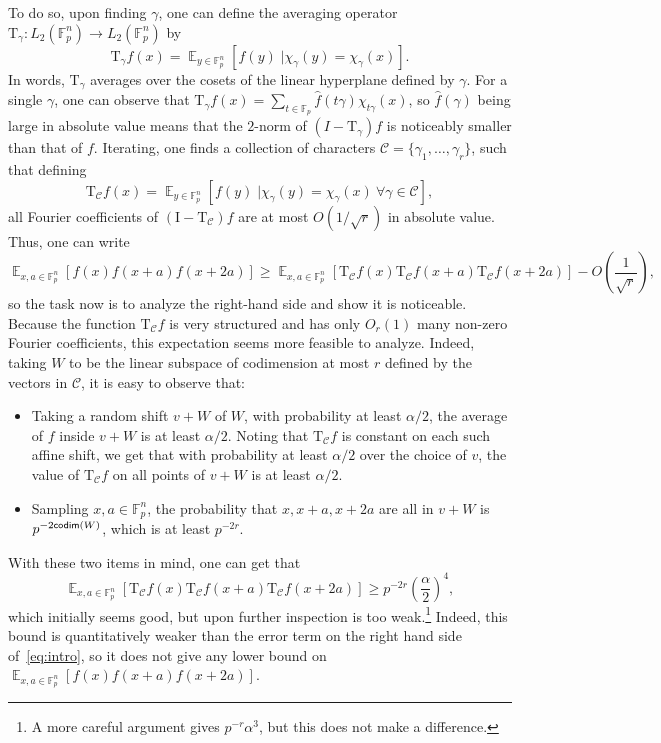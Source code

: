 \documentclass[10pt,a4paper]{amsart}
\newcommand\cExpect[3]{{\mathop{\mathbb{E}}_{#1}\left[ \left. #3 \;\right\vert #2 \right]}}
\newcommand\Expect[2]{{\mathop{\mathbb{E}}_{#1}\left[ {#2} \right]}}
\renewcommand\geq{\geqslant}
\begin{document}
To do so, upon finding $\gamma$, one can define the averaging operator 
$\mathrm{T}_{\gamma}\colon L_2(\mathbb{F}_p^n)\to L_2(\mathbb{F}_p^n)$ by
\[
\mathrm{T}_{\gamma}f(x)
=\cExpect{y\in\mathbb{F}_p^n}
{\chi_{\gamma}(y) = \chi_{\gamma}(x)}{f(y)}.
\]
In words, $\mathrm{T}_{\gamma}$ averages over the cosets of the linear hyperplane defined by $\gamma$. For a single $\gamma$, one can observe that $\mathrm{T}_{\gamma}f(x) = \sum\limits_{t\in\mathbb{F}_p}\widehat{f}(t\gamma)\chi_{t\gamma}(x)$, so $\widehat{f}(\gamma)$ being large in absolute value means that the $2$-norm of $(I-\mathrm{T}_{\gamma})f$ is noticeably smaller than that of $f$. Iterating, one finds a collection of characters $\mathcal{C} = \{\gamma_1,\ldots,\gamma_r\}$, such that defining
\[
\mathrm{T}_{\mathcal{C}}f(x)
=\cExpect{y\in\mathbb{F}_p^n}
{\chi_{\gamma}(y) = \chi_{\gamma}(x)~\forall\gamma\in\mathcal{C}}{f(y)},
\]
all Fourier coefficients of $(\mathrm{I}-\mathrm{T}_{\mathcal{C}})f$ are at most $O(1/\sqrt{r})$ in absolute value. Thus, one can write
\begin{equation}\label{eq:intro}
\Expect{x,a\in\mathbb{F}_p^n}{f(x)f(x+a)f(x+2a)}
\geq
\Expect{x,a\in\mathbb{F}_p^n}{\mathrm{T}_{\mathcal{C}}f(x)\mathrm{T}_{\mathcal{C}}f(x+a)\mathrm{T}_{\mathcal{C}}f(x+2a)}
-O\left(\frac{1}{\sqrt{r}}\right),
\end{equation}
so the task now is to analyze the right-hand side and show it is noticeable. Because the function 
$\mathrm{T}_{\mathcal{C}}f$ is very structured and has only $O_{r}(1)$ many non-zero Fourier coefficients, this expectation seems more feasible to analyze. Indeed, taking $W$ to be the linear subspace of codimension at most $r$ defined by the vectors in $\mathcal{C}$, it is easy to observe that:
\begin{itemize}
    \item Taking a random shift $v+W$ of $W$, with probability at least $\alpha/2$, the average of $f$ inside $v+W$ is at least $\alpha/2$. Noting that $\mathrm{T}_{\mathcal{C}} f$ is constant on each such affine shift, we get that with probability at least $\alpha/2$ over the choice of $v$, the value of $\mathrm{T}_{\mathcal{C}} f$ on all points of $v+W$ is at least $\alpha/2$.
    \item Sampling $x,a\in\mathbb{F}_p^n$, the probability that $x,x+a,x+2a$ are all in $v+W$ is $p^{-2{\sf codim}(W)}$, which is at least $p^{-2r}$.
\end{itemize}
With these two items in mind, one can get that
\[
\Expect{x,a\in\mathbb{F}_p^n}{\mathrm{T}_{\mathcal{C}}f(x)\mathrm{T}_{\mathcal{C}}f(x+a)\mathrm{T}_{\mathcal{C}}f(x+2a)}\geq p^{-2r}\left(\frac{\alpha}{2}\right)^{4},
\]
which initially seems good, but upon further inspection is too weak.\footnote{A more careful argument gives $p^{-r}\alpha^{3}$, but this does not make a difference.} Indeed, this bound is quantitatively weaker than the error term on the right hand side of~\eqref{eq:intro}, so it does not give any lower bound on $\Expect{x,a\in\mathbb{F}_p^n}{f(x)f(x+a)f(x+2a)}$.
\end{document}

